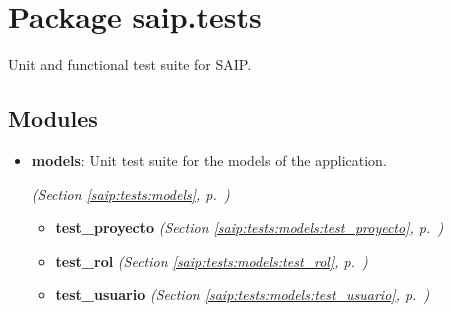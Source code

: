 %
%
%


\section{Package saip.tests}

    \label{saip:tests}
Unit and functional test suite for SAIP.



\subsection{Modules}

\begin{itemize}
\setlength{\parskip}{0ex}
\item \textbf{models}: Unit test suite for the models of the application.



  \textit{(Section \ref{saip:tests:models}, p.~\pageref{saip:tests:models})}

  \begin{itemize}
\setlength{\parskip}{0ex}
    \item \textbf{test\_proyecto}
  \textit{(Section \ref{saip:tests:models:test_proyecto}, p.~\pageref{saip:tests:models:test_proyecto})}

    \item \textbf{test\_rol}
  \textit{(Section \ref{saip:tests:models:test_rol}, p.~\pageref{saip:tests:models:test_rol})}

    \item \textbf{test\_usuario}
  \textit{(Section \ref{saip:tests:models:test_usuario}, p.~\pageref{saip:tests:models:test_usuario})}

  \end{itemize}
\end{itemize}


